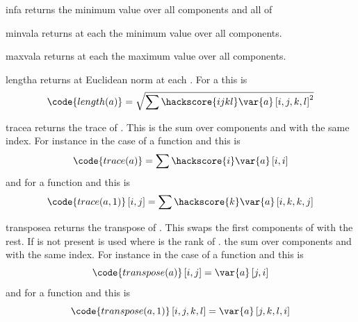 \begin{funcdesc}{inf}{a}
returns the minimum value over all components and all \DataSamplePoints of 
\end{funcdesc}



\begin{funcdesc}{minval}{a}
returns at each \DataSamplePoints the minimum value over all components.
\end{funcdesc}

\begin{funcdesc}{maxval}{a}
returns at each \DataSamplePoints the maximum value over all components.
\end{funcdesc}

\begin{funcdesc}{length}{a}
returns at Euclidean norm at each \DataSamplePoints. For a \RankFour {} this is
\begin{equation}
\code{length(a)}=\sqrt{\sum\hackscore{ijkl} \var{a} \left[i,j,k,l\right]^2}
\end{equation} 
\end{funcdesc}
\begin{funcdesc}{trace}{a}
returns the trace of . This is the sum over components  and  with the same index. For instance in the
case of a \RankTwo function and this is 
\begin{equation}
\code{trace(a)}=\sum\hackscore{i} \var{a} \left[i,i\right]
\end{equation} 
and for a \RankFour function and   this is
\begin{equation}
\code{trace(a,1)}\left[i,j\right]=\sum\hackscore{k} \var{a} \left[i,k,k,j\right]
\end{equation} 
\end{funcdesc}

\begin{funcdesc}{transpose}{a}
returns the transpose of . This swaps the first  components of  with the rest. If  is not
present  is used where  is the rank of . 
 the sum over components  and  with the same index. For instance in the
case of a \RankTwo function and this is 
\begin{equation}
\code{transpose(a)}\left[i,j\right]=\var{a} \left[j,i\right]
\end{equation} 
and for a \RankFour function and   this is
\begin{equation}
\code{transpose(a,1)}\left[i,j,k,l\right]=\var{a} \left[j,k,l,i\right]
\end{equation} 
\end{funcdesc}

